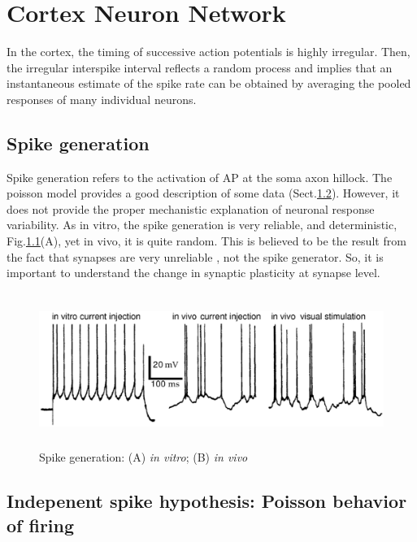 \chapter{Cortex Neuron Network}

In the cortex, the timing of successive action potentials is highly irregular.
Then, the irregular interspike interval reflects a random process and implies
that an instantaneous estimate of the spike rate can be obtained by averaging
the pooled responses of many individual neurons.


\section{Spike generation}

Spike generation refers to the activation of AP at the soma axon hillock.
The poisson  model provides a good description of some data
(Sect.\ref{sec:spike-Poisson}).
However, it does not provide the proper mechanistic explanation of neuronal
response variability. As in vitro, the spike generation is very reliable, and
deterministic, Fig.\ref{fig:spike-generation}(A), yet in vivo, it is quite
random. This is believed to be the result from the fact that synapses are very
unreliable , not the spike generator. So, it is important to understand the
change in synaptic plasticity at synapse level.



\begin{figure}[hbt]
  \centerline{\includegraphics[height=5cm,
    angle=0]{./images/spike-generation.eps}}
  \caption{Spike generation: (A) {\it in vitro}; (B) {\it in vivo}}
  \label{fig:spike-generation}
\end{figure}


\section{Indepenent spike hypothesis: Poisson behavior of firing}
\label{sec:spike-Poisson}

